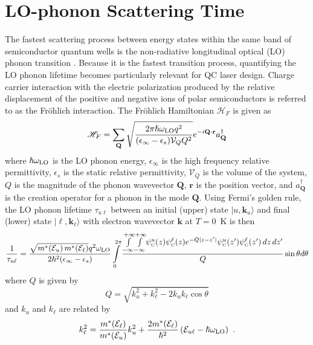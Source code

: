 {\section{LO-phonon Scattering Time}
The fastest scattering process between energy states within the same band of semiconductor quantum wells is the non-radiative longitudinal optical (LO) phonon transition \cite{Ferreira:PRB:1989}.  Because it is the fastest transition process, quantifying the LO phonon lifetime becomes particularly relevant for QC laser design.  Charge carrier interaction with the electric polarization produced by the relative displacement of the positive and negative ions of polar semiconductors is referred to as the Fr\"{o}hlich interaction.  The Fr\"{o}hlich Hamiltonian $\mathscr{H}_F$ is given as
\begin{equation}
\mathscr{H}_F = \sum_{\mathbf{Q}} \sqrt{\frac{2 \pi \hslash\omega_{\textnormal{LO}} q^2}{(\epsilon_\infty - \epsilon_s) \mathcal{V}_Q Q^2}} e^{-i \mathbf{Q}\cdot\mathbf{r}} a_\mathbf{Q}^\dag
\end{equation}
where $\hslash\omega_{\textnormal{LO}}$ is the LO phonon energy, $\epsilon_\infty$ is the high frequency relative permittivity, $\epsilon_s$ is the static relative permittivity, $\mathcal{V}_Q$ is the volume of the system, $Q$ is the magnitude of the phonon wavevector $\mathbf{Q}$, $\mathbf{r}$ is the position vector, and $a_\mathbf{Q}^\dag$ is the creation operator for a phonon in the mode $\mathbf{Q}$.  Using Fermi's golden rule, the LO phonon lifetime $\tau_{u\ell}$ between an initial (upper) state $|u,\mathbf{k}_u\rangle$ and final (lower) state $|\ell,\mathbf{k}_\ell\rangle$ with electron wavevector $\mathbf{k}$ at $T=0$~K is then
\begin{equation}
\label{chpt1eqn:tau_complicated}
\frac{1}{\tau_{u\ell}} = \frac{\sqrt{m^*\!\left(\EE_u\right) m^*\!\left(\EE_\ell\right)} q^2 \omega_{\tn{LO}}}{2 \hslash^2 (\epsilon_\infty - \epsilon_s)} \int\limits_0^{2 \pi} \frac{\int\limits_{-\infty}^{+\infty} \! \int\limits_{-\infty}^{+\infty} \! \psi_\tn{\tiny{C}}^u(z) \psi_\tn{\tiny{C}}^\ell (z) e^{-Q|z-z'|} \psi_\tn{\tiny{C}}^u(z') \psi_\tn{\tiny{C}}^\ell (z') \, dz \, dz'}{Q} \sin\theta d\theta
\end{equation}
where $Q$ is given by
\begin{equation}
Q=\sqrt{k_u^2+k_\ell^2-2 k_u k_\ell \cos\theta}
\end{equation}
and $k_u$ and $k_\ell$ are related by
\begin{equation}
k_\ell^2 = \frac{m^*\!\left(\EE_\ell\right)}{m^*\!\left(\EE_u\right)} k_u^2 + \frac{2 m^*\!\left(\EE_\ell\right)}{\hslash^2} \left(\EE_{u\ell}-\hslash\omega_{\tn{LO}}\right) \tn{~.}

\end{equation}}
